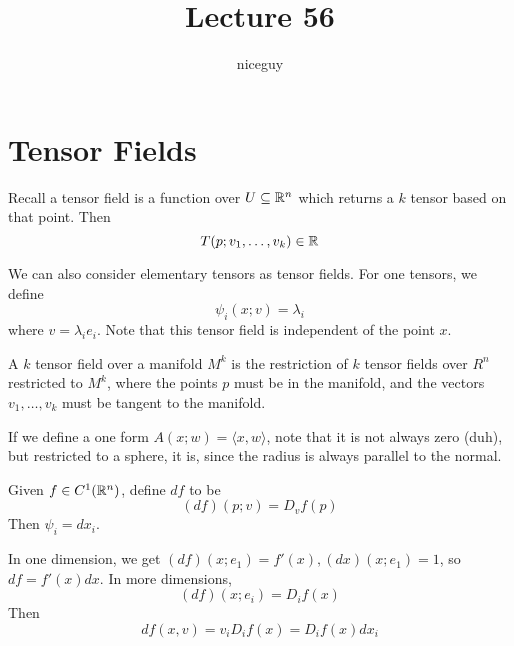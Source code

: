 \documentclass[12pt]{article}
\title{Lecture 56}
\author{niceguy}
\begin{document}
\maketitle

\section{Tensor Fields}

Recall a tensor field is a function over $U \subseteq \mathbb{R}^n$ which returns a $k$ tensor based on that point. Then
$$T(p;v_1,\dots,v_k) \in \mathbb{R}$$

We can also consider elementary tensors as tensor fields. For one tensors, we define
$$\psi_i(x;v) = \lambda_i$$
where $v = \lambda_ie_i$. Note that this tensor field is independent of the point $x$.

\begin{defn}
    A $k$ tensor field over a manifold $M^k$ is the restriction of $k$ tensor fields over $R^n$ restricted to $M^k$, where the points $p$ must be in the manifold, and the vectors $v_1,\dots,v_k$ must be tangent to the manifold.
\end{defn}

If we define a one form $A(x;w) = \langle x,w \rangle$, note that it is not always zero (duh), but restricted to a sphere, it is, since the radius is always parallel to the normal.

\begin{defn}
    Given $f \in C^1(\mathbb{R}^n)$, define $df$ to be
    $$(df)(p;v) = D_vf(p)$$
    Then $\psi_i = dx_i$.
\end{defn}

In one dimension, we get $(df)(x;e_1) = f'(x), (dx)(x;e_1) = 1$, so $df = f'(x)dx$. In more dimensions,
$$(df)(x;e_i) = D_if(x)$$
Then
$$df(x,v) = v_iD_if(x) = D_if(x)dx_i$$
\end{document}
